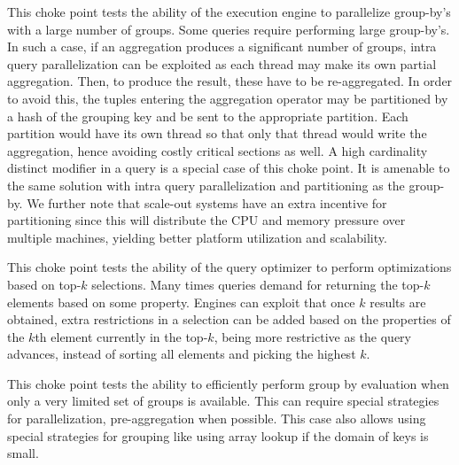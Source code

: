 



This choke point tests the ability of the execution engine to parallelize group-by's with a large number of groups. Some queries require performing large group-by's.
In such a case, if an aggregation produces a significant number of groups, intra query parallelization can be exploited as each thread may make its own partial aggregation.
Then, to produce the result, these have to be re-aggregated. In order to avoid this, the tuples entering the aggregation operator may be partitioned by a hash of the grouping key and be sent to the appropriate partition.
Each partition would have its own thread so that only that thread would write the aggregation, hence avoiding costly critical sections as well. A high cardinality distinct modifier in a query is a special case of this choke point.
It is amenable to the same solution with intra query parallelization and partitioning as the group-by.
We further note that scale-out systems have an extra incentive for partitioning since this will distribute the CPU and memory pressure over multiple machines, yielding better platform utilization and scalability.





This choke point tests the ability of the query optimizer to perform optimizations based on top-$k$ selections. Many times queries demand for returning the top-$k$ elements based on some property.
Engines can exploit that once $k$ results are obtained, extra restrictions in a selection can be added based on the properties of the $k$th element currently in the top-$k$, being more restrictive as the query advances, instead of sorting all elements and picking the highest $k$.





This choke point tests the ability to efficiently perform group by evaluation
when only a very limited set of groups is available.  This can require special
strategies for parallelization, \eg pre-aggregation when possible. This case also allows using special strategies for grouping like using array lookup if the domain of keys is small.

